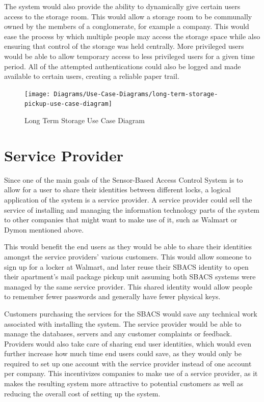 \documentclass[12pt]{report}
\let\Oldsection\section
\renewcommand{\section}{\FloatBarrier\Oldsection}
\begin{document}
The system would also provide the ability to dynamically give certain users access to the storage room. This would allow
a storage room to be communally owned by the members of a conglomerate, for example a company. This would ease the
process by which multiple people may access the storage space while also ensuring that control of the storage was held
centrally. More privileged users would be able to allow temporary access to less privileged users for a given time
period. All of the attempted authentications could also be logged and made available to certain users, creating a
reliable paper trail.

\begin{figure}
    \texttt{[image: Diagrams/Use-Case-Diagrams/long-term-storage-pickup-use-case-diagram]}
    \caption{Long Term Storage Use Case Diagram}
    \label{fig:long-term-storage-pickup-use-case-diagram}
\end{figure}


\section{Service Provider} \label{service-provider}

Since one of the main goals of the Sensor-Based Access Control System is to allow for a user to share their identities
between different locks, a logical application of the system is a service provider. A service provider could sell the service
of installing and managing the information technology parts of the system to other companies that might want to
make use of it, such as Walmart or Dymon mentioned above.

This would benefit the end users as they would be able to share their identities amongst the service providers' various
customers. This would allow someone to sign up for a locker at Walmart, and later reuse their SBACS identity to open
their apartment's mail package pickup unit assuming both SBACS systems were managed by the same service provider. This
shared identity would allow people to remember fewer passwords and generally have fewer physical keys.

Customers purchasing the services for the SBACS would save any technical work associated with installing the system.
The service provider would be able to manage the databases, servers and any customer complaints or feedback. Providers
would also take care of sharing end user identities, which would even further increase how much time end users could save,
as they would only be required to set up one account with the service provider instead of one account per company.
This incentivizes companies to make use of a service provider, as it makes the resulting system more attractive to
potential customers as well as reducing the overall cost of setting up the system.
\end{document}
